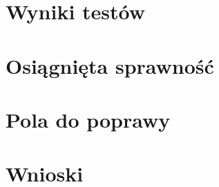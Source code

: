 \section{Wyniki testów}
\section{Osiągnięta sprawność}
\section{Pola do poprawy}
\section{Wnioski}

